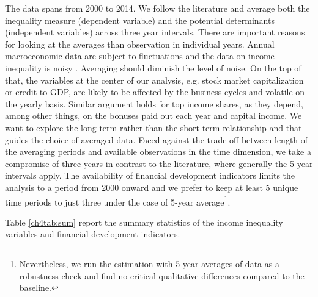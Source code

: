 \begin{refsection}
The data spans from 2000 to 2014. We follow the literature \parencite{dabla2015causes,de2017finance} and average both the inequality measure (dependent variable) and the potential determinants (independent variables) across three year intervals. There are important reasons for looking at the averages than observation in individual years. Annual macroeconomic data are subject to fluctuations and the data on income inequality is noisy \textcite{delis2014}. Averaging should diminish the level of noise. On the top of that, the variables at the center of our analysis, e.g. stock market capitalization or credit to \ac{GDP}, are likely to be affected by the business cycles and volatile on the yearly basis. Similar argument holds for top income shares, as they depend, among other things, on the bonuses paid out each year and capital income. We want to explore the long-term rather than the short-term relationship and that guides the choice of averaged data. Faced against the trade-off between length of the averaging periods and available observations in the time dimension, we take a compromise of three years in contrast to the literature, where generally the 5-year intervals apply. The availability of financial development indicators limits the analysis to a period from 2000 onward and we prefer to keep at least 5 unique time periods to just three under the case of 5-year average\footnote{Nevertheless, we run the estimation with 5-year averages of data as a robustness check and find no critical qualitative differences compared to the baseline.}.

Table \ref{ch4tab:sum} report the summary statistics of the income inequality variables and financial development indicators.



\end{refsection}
